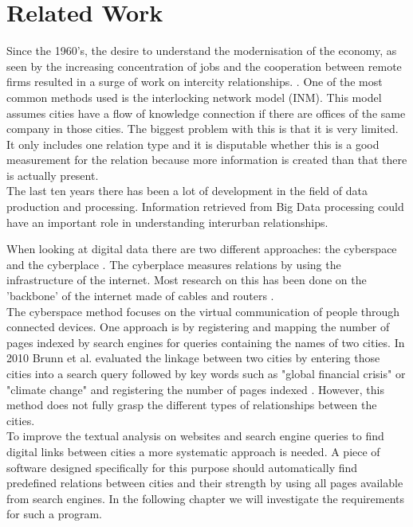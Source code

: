 \section{Related Work}
Since the 1960's, the desire to understand the modernisation of the economy, as seen by the increasing concentration of jobs and the cooperation between remote firms resulted in a surge of work on intercity relationships. \cite{tornqvist1968flows}.
One of the most common methods used is the interlocking network model (INM)\cite{taylor2012interlocking}. This model assumes cities have a flow of knowledge connection if there are offices of the same company in those cities. The biggest problem with this is that it is very limited. It only includes one relation type and it is disputable whether this is a good measurement for the relation because more information is created than that there is actually present. \\

The last ten years there has been a lot of development in the field of data production and processing. Information retrieved from Big Data processing could have an important role in understanding interurban relationships.

When looking at digital data there are two different approaches: the cyberspace and the cyberplace \cite{devriendt2008cyberplace}. The cyberplace measures relations by using the infrastructure of the internet. Most research on this has been done on the 'backbone' of the internet made of cables and routers \cite{choi2006comparing, gorman2000networks}. \\

The cyberspace method focuses on the virtual communication of people through connected devices. One approach is by registering and mapping the number of pages indexed by search engines for queries containing the names of two cities\cite{devriendt2008cyberplace, janc2015visibility, janc2015geography}. In 2010 Brunn et al. evaluated the linkage between two cities by entering those cities into a search query followed by key words such as "global financial crisis" or "climate change" and registering the number of pages indexed \cite{brunn2010networks}. However, this method does not fully grasp the different types of relationships between the cities. \\

To improve the textual analysis on websites and search engine queries to find digital links between cities a more systematic approach is needed.  A piece of software designed specifically for this purpose should automatically find predefined relations between cities and their strength by using all pages available from search engines. In the following chapter we will investigate the requirements for such a program.
